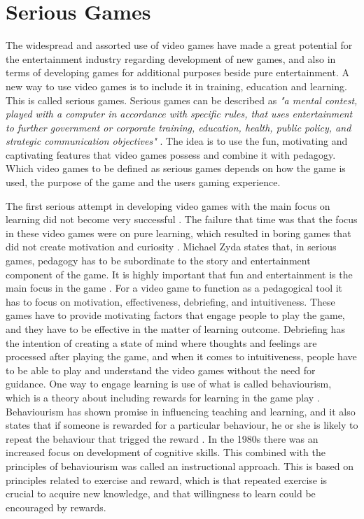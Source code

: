 \section{Serious Games}
\label{sec:sergames}
The widespread and assorted use of video games have made a great potential for the entertainment industry regarding development of new games, and also in terms of developing games for additional purposes beside pure entertainment. A new way to use video games is to include it in training, education and learning. This is called serious games. Serious games can be described as \emph{"a mental contest, played with a computer in accordance with specific rules, that uses entertainment to further government or corporate training, education, health, public policy, and strategic communication objectives"} \cite{zyda2005visual}. The idea is to use the fun, motivating and captivating features that video games possess and combine it with pedagogy. Which video games to be defined as serious games depends on how the game is used, the purpose of the game and the users gaming experience. 

The first serious attempt in developing video games with the main focus on learning did not become very successful \cite{understandingvg}. The failure that time was that the focus in these  video games were on pure learning, which resulted in boring games that did not create motivation and curiosity \cite{understandingvg} \cite{susi2007serious}. Michael Zyda states that, in serious games, pedagogy has to be subordinate to the story and entertainment component of the game. It is highly important that fun and entertainment is the main focus in the game \cite{zyda2005visual}. For a video game to function as a pedagogical tool it has to focus on motivation, effectiveness, debriefing, and intuitiveness. These games have to provide motivating factors that engage people to play the game, and they have to be effective in the matter of learning outcome. Debriefing has the intention of creating a state of mind where thoughts and feelings are processed after playing the game, and when it comes to intuitiveness, people have to be able to play and understand the video games without the need for guidance. One way to engage learning is use of what is called behaviourism, which is a theory about including rewards for learning in the game play \cite{understandingvg}. Behaviourism has shown promise in influencing teaching and learning, and it also states that if someone is rewarded for a particular behaviour, he or she is likely to repeat the behaviour that trigged the reward \cite{understandingvg} \cite{behaviour}. In the 1980s there was an increased focus on development of cognitive skills. This combined with the principles of behaviourism was called an instructional approach. This is based on principles related to exercise and reward, which is that repeated exercise is crucial to acquire new knowledge, and that willingness to learn could be encouraged by rewards. 

